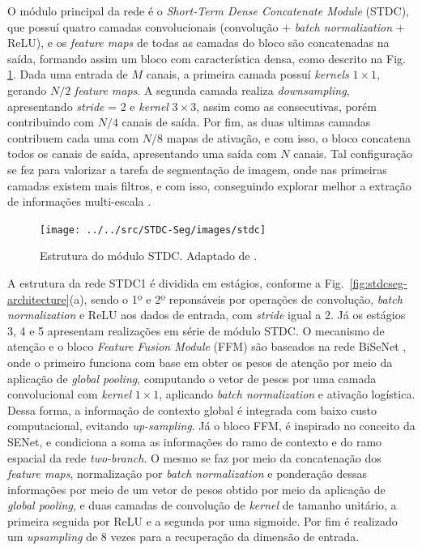 \documentclass[conference]{IEEEtran}
\begin{document}
O módulo principal da rede é o \textit{Short-Term Dense Concatenate Module} (STDC), que possuí quatro camadas convolucionais (convolução + \textit{batch normalization} + ReLU), e os \textit{feature maps} de todas as camadas do bloco são concatenadas na saída, formando assim um bloco com característica densa, como descrito na Fig. \ref{fig:stdc}. Dada uma entrada de $M$ canais, a primeira camada possuí \textit{kernels} $1 \times 1$, gerando $N/2$ \textit{feature maps}. A segunda camada realiza \textit{downsampling}, apresentando \textit{stride} = 2 e \textit{kernel} $3 \times 3$, assim como as consecutivas, porém contribuindo com $N/4$ canais de saída. Por fim, as duas ultimas camadas contribuem cada uma com $N/8$ mapas de ativação, e com isso, o bloco concatena todos os canais de saída, apresentando uma saída com $N$ canais. Tal configuração se fez para valorizar a tarefa de segmentação de imagem, onde nas primeiras camadas existem mais filtros, e com isso, conseguindo explorar melhor a extração de informações multi-escala \cite{fan2021RethinkingBiSeNetRealtime}.

\begin{figure}[h!]
	\centering
	\texttt{[image: ../../src/STDC-Seg/images/stdc]}
	\caption{Estrutura do módulo STDC. Adaptado de \cite{fan2021RethinkingBiSeNetRealtime}.}
	\label{fig:stdc}
\end{figure}


A estrutura da rede STDC1 é dividida em estágios, conforme a Fig.~\ref{fig:stdcseg-architecture}(a), sendo o 1º e 2º reponsáveis por operações de convolução, \textit{batch normalization} e ReLU aos dados de entrada, com \textit{stride} igual a 2. Já os estágios 3, 4 e 5 apresentam realizações em série de módulo STDC. O mecanismo de atenção e o bloco \textit{Feature Fusion Module} (FFM) são baseados na rede BiSeNet \cite{yu2018BiSeNetBilateralSegmentation}, onde o primeiro funciona com base em obter os pesos de atenção por meio da aplicação de \textit{global pooling}, computando o vetor de pesos por uma camada convolucional com \textit{kernel} $1 \times 1$, aplicando \textit{batch normalization} e ativação logística. Dessa forma, a informação de contexto global é integrada com baixo custo computacional, evitando \textit{up-sampling}. Já o bloco FFM, é inspirado no conceito da SENet, e condiciona a soma as informações do ramo de contexto e do ramo espacial da rede \textit{two-branch}. O mesmo se faz por meio da concatenação dos \textit{feature maps}, normalização por \textit{batch normalization} e ponderação dessas informações por meio de um vetor de pesos obtido por meio da aplicação de \textit{global pooling}, e duas camadas de convolução de \textit{kernel} de tamanho unitário, a primeira seguida por ReLU e a segunda por uma sigmoide. Por fim é realizado um \textit{upsampling} de 8 vezes para a recuperação da dimensão de entrada.
\end{document}
